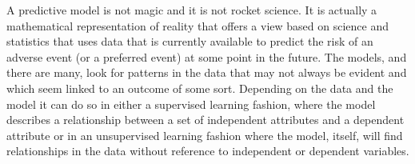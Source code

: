 





























A predictive model is not magic and it is not rocket science. It is actually a mathematical representation
of reality that offers a view based on science and statistics that uses data that is currently available to
predict the risk of an adverse event (or a preferred event) at some point in the future. The models, and
there are many, look for patterns in the data that may not always be evident and which seem linked to
an outcome of some sort. Depending on the data and the model it can do so in either a supervised
learning fashion, where the model describes a relationship between a set of independent attributes and
a dependent attribute or in an unsupervised learning fashion where the model, itself, will find
relationships in the data without reference to independent or dependent variables.


